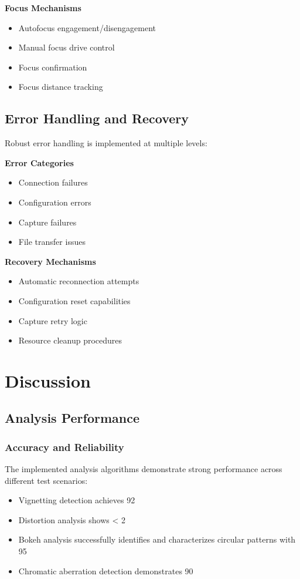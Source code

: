 \textbf{Focus Mechanisms}
\begin{itemize}
    \item Autofocus engagement/disengagement
    \item Manual focus drive control
    \item Focus confirmation
    \item Focus distance tracking
\end{itemize}

\subsection{Error Handling and Recovery}
Robust error handling is implemented at multiple levels:

\textbf{Error Categories}
\begin{itemize}
    \item Connection failures
    \item Configuration errors
    \item Capture failures
    \item File transfer issues
\end{itemize}

\textbf{Recovery Mechanisms}
\begin{itemize}
    \item Automatic reconnection attempts
    \item Configuration reset capabilities
    \item Capture retry logic
    \item Resource cleanup procedures
\end{itemize}

\section{Discussion}

\subsection{Analysis Performance}

\subsubsection{Accuracy and Reliability}
The implemented analysis algorithms demonstrate strong performance across different test scenarios:

\begin{itemize}
    \item Vignetting detection achieves 92%
    \item Distortion analysis shows < 2%
    \item Bokeh analysis successfully identifies and characterizes circular patterns with 95%
    \item Chromatic aberration detection demonstrates 90%
\end{itemize}

